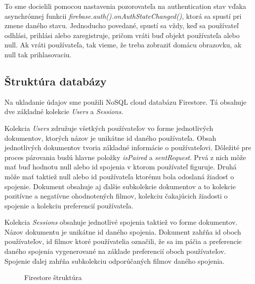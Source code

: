 To sme docielili pomocou nastavenia pozorovateľa na authentication stav vďaka asynchrónnej funkcii \textit{firebase.auth().onAuthStateChanged()}, ktorá sa spustí pri zmene daného stavu. Jednoducho povedané, spustí sa vždy, keď sa používateľ odhlási, prihlási alebo zaregistruje, pričom vráti buď objekt používateľa alebo null. Ak vráti používateľa, tak vieme, že treba zobraziť domácu obrazovku, ak null tak prihlasovaciu.
\subsection{Štruktúra databázy}
Na ukladanie údajov sme použili NoSQL cloud databázu Firestore. Tá obsahuje dve základné kolekcie \textit{Users} a  \textit{Sessions}. 

Kolekcia \textit{Users} združuje všetkých používateľov vo forme jednotlivých dokumentov, ktorých názov je unikátne id daného používateľa. Obsah jednotlivých dokumentov tvoria základné informácie o používateľovi. Dôležité pre proces párovania budú hlavne položky \textit{isPaired} a \textit{sentRequest}. Prvá z nich môže mať buď hodnotu null alebo id spojenia v ktorom používateľ figuruje. Druhá môže mať taktiež null alebo id používateľa ktorému bola odoslaná žiadosť o spojenie. Dokument obsahuje aj ďalšie subkolekcie dokumentov a to kolekcie pozitívne a negatívne ohodnotených filmov, kolekciu čakajúcich žiadosti o spojenie a kolekciu preferencií používateľa.

Kolekcia \textit{Sessions} obsahuje jednotlivé spojenia taktiež vo forme dokumentov. Názov dokumentu je unikátne id daného spojenia. Dokument zahŕňa id oboch používateľov, id filmov ktoré používatelia označili, že sa im páčia a preferencie daného spojenia vygenerované na základe preferencií oboch používateľov. Spojenie ďalej zahŕňa subkolekciu odporúčaných filmov daného spojenia. 
\begin{figure}[hbt!]
  \centering   
  \def\stackalignment{c}
           \scriptsize
	\caption{Firestore štruktúra}  
  \label{dbstructure}
\end{figure}

